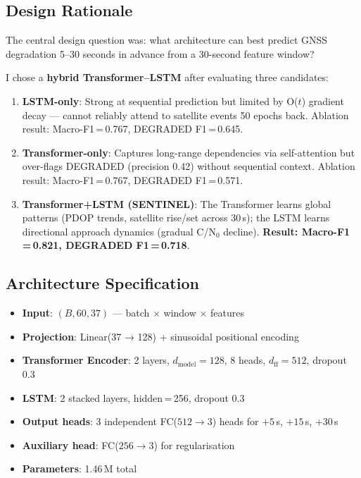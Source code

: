 \documentclass[12pt,a4paper]{article}
\begin{document}
\subsection{Design Rationale}

The central design question was: what architecture can best predict GNSS degradation
5--30 seconds in advance from a 30-second feature window?

I chose a \textbf{hybrid Transformer--LSTM} after evaluating three candidates:

\begin{enumerate}
  \item \textbf{LSTM-only}: Strong at sequential prediction but limited by O($t$)
    gradient decay — cannot reliably attend to satellite events 50 epochs back.
    Ablation result: Macro-F1\,=\,0.767, DEGRADED F1\,=\,0.645.

  \item \textbf{Transformer-only}: Captures long-range dependencies via self-attention
    but over-flags DEGRADED (precision 0.42) without sequential context.
    Ablation result: Macro-F1\,=\,0.767, DEGRADED F1\,=\,0.571.

  \item \textbf{Transformer+LSTM (SENTINEL)}: The Transformer learns global patterns
    (PDOP trends, satellite rise/set across 30\,s); the LSTM learns directional
    approach dynamics (gradual C/N$_0$ decline).
    \textbf{Result: Macro-F1\,=\,0.821, DEGRADED F1\,=\,0.718}.
\end{enumerate}

\subsection{Architecture Specification}

\begin{itemize}
  \item \textbf{Input}: $(B, 60, 37)$ — batch $\times$ window $\times$ features
  \item \textbf{Projection}: Linear(37 → 128) + sinusoidal positional encoding
  \item \textbf{Transformer Encoder}: 2 layers, $d_\mathrm{model}=128$, 8 heads,
    $d_\mathrm{ff}=512$, dropout 0.3
  \item \textbf{LSTM}: 2 stacked layers, hidden\,=\,256, dropout 0.3
  \item \textbf{Output heads}: 3 independent FC($512 \to 3$) heads for
    $+5$\,s, $+15$\,s, $+30$\,s
  \item \textbf{Auxiliary head}: FC($256 \to 3$) for regularisation
  \item \textbf{Parameters}: 1.46\,M total
\end{itemize}
\end{document}
